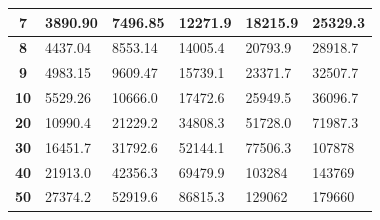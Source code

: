 \begin{table}[H]
\begin{tabular}{|c|l|l|l|l|l|}
\textbf{7}                                                                          & 3890.90                              & 7496.85                               & 12271.9                               & 18215.9                               & 25329.3                               \\ \hline
\textbf{8}                                                                          & 4437.04                              & 8553.14                               & 14005.4                               & 20793.9                               & 28918.7                               \\ \hline
\textbf{9}                                                                          & 4983.15                              & 9609.47                               & 15739.1                               & 23371.7                               & 32507.7                               \\ \hline
\textbf{10}                                                                         & 5529.26                              & 10666.0                               & 17472.6                               & 25949.5                               & 36096.7                               \\ \hline
\textbf{20}                                                                         & 10990.4                              & 21229.2                               & 34808.3                               & 51728.0                               & 71987.3                               \\ \hline
\textbf{30}                                                                         & 16451.7                              & 31792.6                               & 52144.1                               & 77506.3                               & 107878                                \\ \hline
\textbf{40}                                                                         & 21913.0                              & 42356.3                               & 69479.9                               & 103284                                & 143769                                \\ \hline
\textbf{50}                                                                         & 27374.2                              & 52919.6                               & 86815.3                               & 129062                                & 179660                                \\ \hline

\end{tabular}
\end{table}
